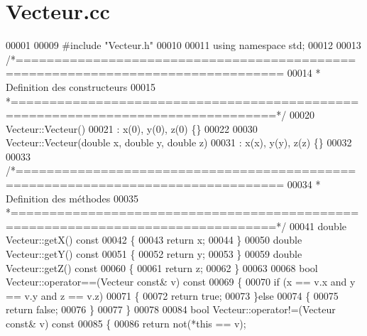 \section{Vecteur.\+cc}
\label{_vecteur_8cc_source}

\begin{DoxyCode}
00001 
00009 \textcolor{preprocessor}{#include "Vecteur.h"}
00010 
00011 \textcolor{keyword}{using namespace }std;
00012 
00013 \textcolor{comment}{/*================================================================================}
00014 \textcolor{comment}{ * Definition des constructeurs}
00015 \textcolor{comment}{ *================================================================================*/}
00020 Vecteur::Vecteur()
00021     : x(0), y(0), z(0) \{\}
00022 
00030 Vecteur::Vecteur(\textcolor{keywordtype}{double} x, \textcolor{keywordtype}{double} y, \textcolor{keywordtype}{double} z)
00031     : x(x), y(y), z(z) \{\}
00032 
00033 \textcolor{comment}{/*================================================================================}
00034 \textcolor{comment}{ * Definition des méthodes }
00035 \textcolor{comment}{ *================================================================================*/}
00041 \textcolor{keywordtype}{double} Vecteur::getX()\textcolor{keyword}{ const}
00042 \textcolor{keyword}{}\{
00043     \textcolor{keywordflow}{return} x;
00044 \} 
00050 \textcolor{keywordtype}{double} Vecteur::getY()\textcolor{keyword}{ const}
00051 \textcolor{keyword}{}\{
00052     \textcolor{keywordflow}{return} y;
00053 \}
00059 \textcolor{keywordtype}{double} Vecteur::getZ()\textcolor{keyword}{ const}
00060 \textcolor{keyword}{}\{
00061     \textcolor{keywordflow}{return} z;
00062 \}
00063 
00068 \textcolor{keywordtype}{bool} Vecteur::operator==(Vecteur \textcolor{keyword}{const}& v)\textcolor{keyword}{ const}
00069 \textcolor{keyword}{}\{
00070     \textcolor{keywordflow}{if} (x == v.x and y == v.y and z == v.z) 
00071     \{ 
00072         \textcolor{keywordflow}{return} \textcolor{keyword}{true}; 
00073     \}\textcolor{keywordflow}{else} 
00074     \{ 
00075         \textcolor{keywordflow}{return} \textcolor{keyword}{false}; 
00076     \}
00077 \}
00078 
00084 \textcolor{keywordtype}{bool} Vecteur::operator!=(Vecteur \textcolor{keyword}{const}& v)\textcolor{keyword}{ const}
00085 \textcolor{keyword}{}\{
00086     \textcolor{keywordflow}{return} not(*\textcolor{keyword}{this} == v);

\end{DoxyCode}
